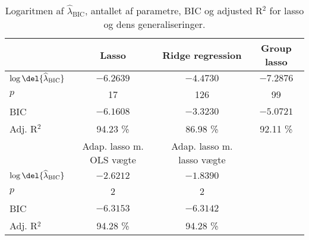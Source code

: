 \begin{table}
\center
\begin{tabular}{lccc} 
\toprule
& \multicolumn{1}{c}{Lasso} & \multicolumn{1}{c}{Ridge regression}  &  \multicolumn{1}{c}{Group lasso}\\ \midrule
$\log \del{\widehat{\lambda}_\text{BIC}}$ & $-6.2639$ & $-4.4730$  & $-7.2876$ \\
$p$ & 17 & 126 & 99 \\
BIC & $-6.1608 $& $-3.3230$ & $-5.0721$  \\
Adj. R$^2$ & 94.23 \% & 86.98  \%   & 92.11 \%  \\ \bottomrule \toprule
& Adap. lasso m. OLS vægte & Adap. lasso m. lasso vægte \\ \midrule
$\log \del{ \widehat{\lambda}_\text{BIC}}$ &  $-2.6212$& $-1.8390$ \\
$p$ & 2&2 \\
BIC &  $-6.3153$&$-6.3142$ \\
Adj. R$^2$ & 94.28 \% &  94.28 \% \\ \bottomrule
 \end{tabular}
\caption{Logaritmen af $\widehat{\lambda}_\text{BIC}$, antallet af parametre, BIC og adjusted R$^2$ for lasso og dens generaliseringer.} \label{tab:bic_lambda}
\end{table}